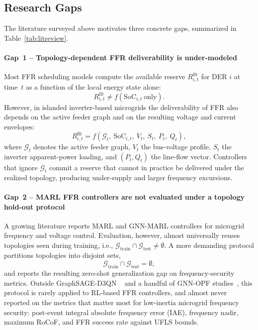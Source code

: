\documentclass[lettersize,journal]{IEEEtran}
\begin{document}
\subsection{Research Gaps}
\label{ssec:gaps}

The literature surveyed above motivates three concrete gaps, summarized in Table~\ref{tab:litreview}.
\paragraph*{Gap~1 -- Topology-dependent FFR deliverability is under-modeled}

Most FFR scheduling models compute the available reserve
$R^{\mathrm{ffr}}_{i,t}$ for DER $i$ at time~$t$ as a function of the
local energy state alone:
\begin{equation}
R^{\mathrm{ffr}}_{i,t}\neq f\!\left(\mathrm{SoC}_{i,t}\ \text{only}\right).
\label{eq:gap1bad}
\end{equation}
However, in islanded inverter-based microgrids the deliverability of FFR also depends on the active feeder graph and on the resulting voltage and current envelopes:
\begin{equation}
R^{\mathrm{ffr}}_{i,t}=f\!\left(\mathcal{G}_t,\ \mathrm{SoC}_{i,t},\
V_t,\ S_t,\ P_t,\ Q_t\right),
\label{eq:gap1good}
\end{equation}
where $\mathcal{G}_t$ denotes the active feeder graph, $V_t$ the bus-voltage profile, $S_t$ the inverter apparent-power loading, and $(P_t,Q_t)$ the line-flow vector. Controllers that ignore $\mathcal{G}_t$ commit a reserve that cannot in practice be delivered under the realized topology, producing under-supply and larger frequency excursions.

\paragraph*{Gap~2 -- MARL FFR controllers are not evaluated under a topology hold-out protocol}

A growing literature reports MARL and GNN-MARL controllers for microgrid frequency and voltage control. Evaluation, however, almost universally reuses topologies seen during training, i.e.,
$\mathcal{G}_{\text{train}}\cap\mathcal{G}_{\text{test}}\neq\emptyset$.
A more demanding protocol partitions topologies into disjoint sets,
\begin{equation}
\mathcal{G}_{\text{train}}\cap\mathcal{G}_{\text{test}}=\emptyset,
\label{eq:gap2}
\end{equation}
and reports the resulting zero-shot generalization gap on frequency-security metrics. Outside GraphSAGE-D3QN ~\cite{pei2023graphsage} and a handful of GNN-OPF studies~\cite{yang2024pggnn,liu2022topology}, this protocol is rarely applied to RL-based FFR controllers, and almost never reported on the metrics that matter most for low-inertia microgrid frequency security: post-event integral absolute frequency error (IAE), frequency nadir, maximum RoCoF, and FFR success rate against UFLS bounds.
\end{document}
